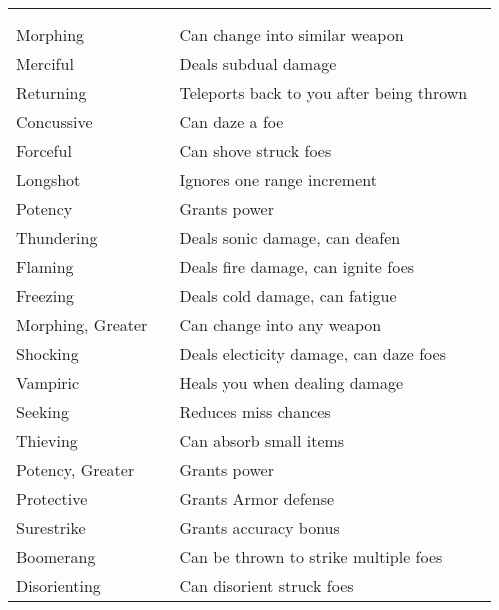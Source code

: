 
\begin{longtabuwrapper}
\begin{longtabu}{l l X l}
 \\
 &  &  &  \\
\bottomrule
Morphing &  & Can change into similar weapon & \pageref{item:Morphing} \\
Merciful &  & Deals subdual damage & \pageref{item:Merciful} \\
Returning &  & Teleports back to you after being thrown & \pageref{item:Returning} \\
Concussive &  & Can daze a foe & \pageref{item:Concussive} \\
Forceful &  & Can shove struck foes & \pageref{item:Forceful} \\
Longshot &  & Ignores one range increment & \pageref{item:Longshot} \\
Potency &  & Grants  power & \pageref{item:Potency} \\
Thundering &  & Deals sonic damage, can deafen & \pageref{item:Thundering} \\
Flaming &  & Deals fire damage, can ignite foes & \pageref{item:Flaming} \\
Freezing &  & Deals cold damage, can fatigue & \pageref{item:Freezing} \\
Morphing, Greater &  & Can change into any weapon & \pageref{item:Morphing, Greater} \\
Shocking &  & Deals electicity damage, can daze foes & \pageref{item:Shocking} \\
Vampiric &  & Heals you when dealing damage & \pageref{item:Vampiric} \\
Seeking &  & Reduces miss chances & \pageref{item:Seeking} \\
Thieving &  & Can absorb small items & \pageref{item:Thieving} \\
Potency, Greater &  & Grants  power & \pageref{item:Potency, Greater} \\
Protective &  & Grants  Armor defense & \pageref{item:Protective} \\
Surestrike &  & Grants  accuracy bonus & \pageref{item:Surestrike} \\
Boomerang &  & Can be thrown to strike multiple foes & \pageref{item:Boomerang} \\
Disorienting &  & Can disorient struck foes & \pageref{item:Disorienting} \\

\end{longtabu}
\end{longtabuwrapper}
